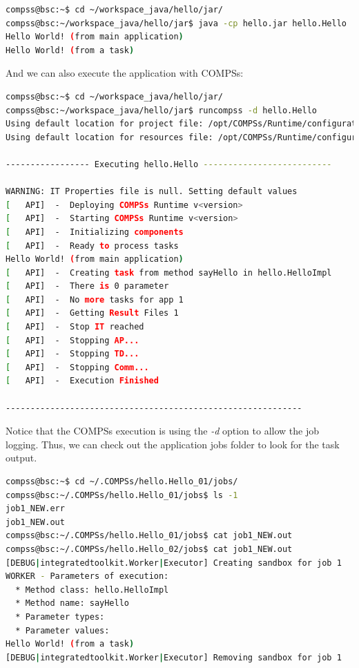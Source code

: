 \begin{lstlisting}[language=bash]
compss@bsc:~$ cd ~/workspace_java/hello/jar/
compss@bsc:~/workspace_java/hello/jar$ java -cp hello.jar hello.Hello 
Hello World! (from main application)
Hello World! (from a task)
\end{lstlisting}

And we can also execute the application with COMPSs:

\begin{lstlisting}[language=bash]
compss@bsc:~$ cd ~/workspace_java/hello/jar/
compss@bsc:~/workspace_java/hello/jar$ runcompss -d hello.Hello
Using default location for project file: /opt/COMPSs/Runtime/configuration/xml/projects/project.xml
Using default location for resources file: /opt/COMPSs/Runtime/configuration/xml/resources/resources.xml

----------------- Executing hello.Hello --------------------------

WARNING: IT Properties file is null. Setting default values
[   API]  -  Deploying COMPSs Runtime v<version>
[   API]  -  Starting COMPSs Runtime v<version>
[   API]  -  Initializing components
[   API]  -  Ready to process tasks
Hello World! (from main application)
[   API]  -  Creating task from method sayHello in hello.HelloImpl
[   API]  -  There is 0 parameter
[   API]  -  No more tasks for app 1
[   API]  -  Getting Result Files 1
[   API]  -  Stop IT reached
[   API]  -  Stopping AP...
[   API]  -  Stopping TD...
[   API]  -  Stopping Comm...
[   API]  -  Execution Finished

------------------------------------------------------------
\end{lstlisting}

Notice that the COMPSs execution is using the \textit{-d} option to allow the job logging. Thus, we can check out the application jobs folder to look for
the task output.

\begin{lstlisting}[language=bash]
compss@bsc:~$ cd ~/.COMPSs/hello.Hello_01/jobs/
compss@bsc:~/.COMPSs/hello.Hello_01/jobs$ ls -1
job1_NEW.err
job1_NEW.out
compss@bsc:~/.COMPSs/hello.Hello_01/jobs$ cat job1_NEW.out
compss@bsc:~/.COMPSs/hello.Hello_02/jobs$ cat job1_NEW.out 
[DEBUG|integratedtoolkit.Worker|Executor] Creating sandbox for job 1
WORKER - Parameters of execution:
  * Method class: hello.HelloImpl
  * Method name: sayHello
  * Parameter types:
  * Parameter values:
Hello World! (from a task)
[DEBUG|integratedtoolkit.Worker|Executor] Removing sandbox for job 1
\end{lstlisting}

